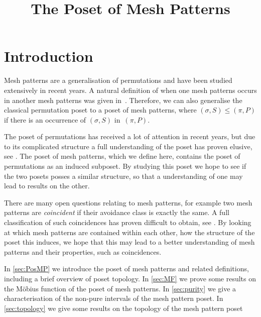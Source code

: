 \documentclass[11pt,a4paper,oneside]{article}
\title{The Poset of Mesh Patterns}
\begin{document}
	\maketitle

\section{Introduction}
Mesh patterns are a generalisation of permutations and have been studied extensively in recent years.
A natural definition of when one mesh patterns occurs in another mesh patterns was given in~\cite{TU17}.
Therefore, we can also generalise the classical permutation poset to a poset of mesh patterns, where 
$(\sigma,S)\le(\pi,P)$ if there is an occurrence of $(\sigma,S)$ in~$(\pi,P)$.

The poset of permutations has received a lot of attention in recent years, but due to its
complicated structure a full understanding of the poset has proven elusive,
see \cite{Smith14,Smith15}. The poset of mesh patterns, which we define
here, contains the poset of permutations as an induced subposet. By studying this poset we 
hope to see if the two posets posses a similar structure, so that a understanding of one 
may lead to results on the other.

There are many open questions relating to mesh patterns, for example two mesh patterns
are \emph{coincident} if their avoidance class is exactly the same. A full classification
of such coincidences has proven difficult to obtain, see \cite{}. By looking at which
mesh patterns are contained within each other, how the structure of the poset this induces,
we hope that this may lead to a better understanding of mesh patterns and their properties,
such as coincidences.

In \cref{sec:PosMP} we introduce the poset of mesh patterns and related definitions,
including a brief overview of poset topology. In \cref{sec:MF} we prove some results
on the M\"obius function of the poset of mesh patterns. In \cref{sec:purity} we give
a characterisation of the non-pure intervals of the mesh pattern poset.
In \cref{sec:topology} we give some results on the topology of the mesh pattern poset
\end{document}

